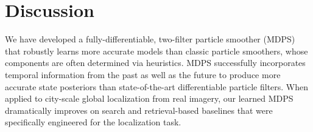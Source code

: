 
\section{Discussion}

    We have developed a fully-differentiable, two-filter particle smoother (MDPS) that robustly learns more accurate models than classic particle smoothers, whose components are often determined via heuristics.  MDPS successfully incorporates temporal information from the past as well as the future to produce more accurate state posteriors than state-of-the-art differentiable particle filters. When applied to city-scale global localization from real imagery, our learned MDPS dramatically improves on search and retrieval-based baselines that were specifically engineered for the localization task.